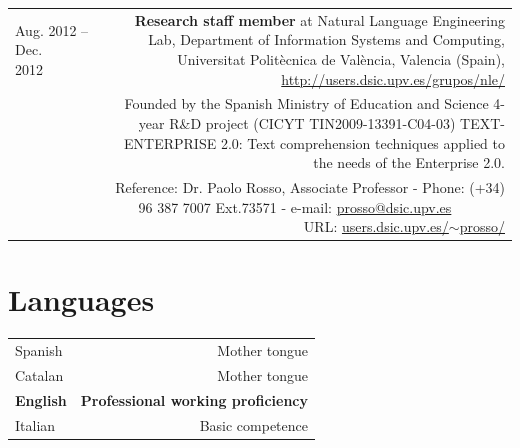 \documentclass[10pt]{article}
\begin{document}
\begin{tabular}{L!{\VRule}R}
Aug. 2012 -- Dec. 2012~~~~&{\textbf{Research staff member} at Natural Language Engineering Lab, Department of Information Systems and Computing, Universitat Polit{\`e}cnica de 
Val{\`e}ncia, Valencia (Spain), \url{http://users.dsic.upv.es/grupos/nle/}}\\
&\scriptsize{Founded by the Spanish Ministry of Education and Science 4-year R\&D project (CICYT TIN2009-13391-C04-03) TEXT-ENTERPRISE 2.0: Text comprehension techniques
applied to the needs of the Enterprise 2.0.}\\
&\scriptsize{Reference: Dr. Paolo Rosso, Associate Professor - Phone: (+34) 96 387 7007 Ext.73571 - e-mail: \href{mailto:prosso@dsic.upv.es}{prosso@dsic.upv.es} ~~~~~~~ URL: \href{http://users.dsic.upv.es/~prosso/}{users.dsic.upv.es/$\sim$prosso/}}\\
\end{tabular}

\section*{Languages}
\begin{tabular}{L!{\VRule}R}
Spanish&Mother tongue\\
Catalan&Mother tongue\\
{\bf English}&{\bf Professional working proficiency}\\
Italian&Basic competence\\
\end{tabular}
\end{document}
